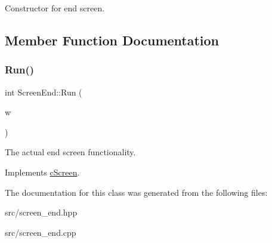 Constructor for end screen. 

\subsection{Member Function Documentation}
\hypertarget{classScreenEnd_a3582fcab70f5568fcdc187feeb1383ad}{}\label{classScreenEnd_a3582fcab70f5568fcdc187feeb1383ad} 
\subsubsection{\texorpdfstring{Run()}{Run()}}
{\footnotesize\ttfamily int Screen\+End\+::\+Run (\begin{DoxyParamCaption}\item[{sf\+::\+Render\+Window \&}]{w }\end{DoxyParamCaption})\hspace{0.3cm}{\ttfamily [virtual]}}

The actual end screen functionality. 

Implements \hyperlink{classcScreen_a4b4057ffec7ab1492a4de19f9994cac4}{c\+Screen}.



The documentation for this class was generated from the following files\+:\begin{DoxyCompactItemize}
\item 
src/screen\+\_\+end.\+hpp\item 
src/screen\+\_\+end.\+cpp\end{DoxyCompactItemize}
